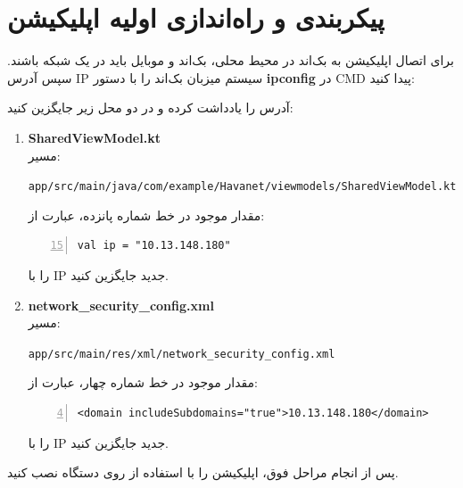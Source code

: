 \documentclass{report}
\begin{document}
\section{پیکربندی و راه‌اندازی اولیه اپلیکیشن}

برای اتصال اپلیکیشن به بک‌اند در محیط محلی، بک‌اند و موبایل باید در یک شبکه باشند. سپس آدرس IP سیستم میزبان بک‌اند را با دستور \textbf{ipconfig} در CMD پیدا کنید:

\vspace{0.3cm}

آدرس  را یادداشت کرده و در دو محل زیر جایگزین کنید:

\begin{enumerate}
	\item \textbf{SharedViewModel.kt}\\
	مسیر: \\
	\begin{latin}
		\texttt{app/src/main/java/com/example/Havanet/viewmodels/SharedViewModel.kt}\\
	\end{latin}
	مقدار موجود در خط شماره پانزده، عبارت از:
\begin{latin}
\begin{lstlisting}[mathescape=true, numbers=left, firstnumber=15]
val ip = "10.13.148.180"
\end{lstlisting}
\end{latin}
	را با IP جدید جایگزین کنید.
	
\item \textbf{network\_security\_config.xml}\\
	مسیر: \\
\begin{latin}
\texttt{app/src/main/res/xml/network\_security\_config.xml}\\
\end{latin}
	مقدار موجود در خط شماره چهار، عبارت از:
\begin{latin}
\begin{lstlisting}[mathescape=true, numbers=left, firstnumber=4]
<domain includeSubdomains="true">10.13.148.180</domain>
		\end{lstlisting}
	\end{latin}
	را با IP جدید جایگزین کنید.
\end{enumerate}

\vspace{0.5cm}

پس از انجام مراحل فوق، اپلیکیشن را با استفاده از  روی دستگاه نصب کنید.
\end{document}
